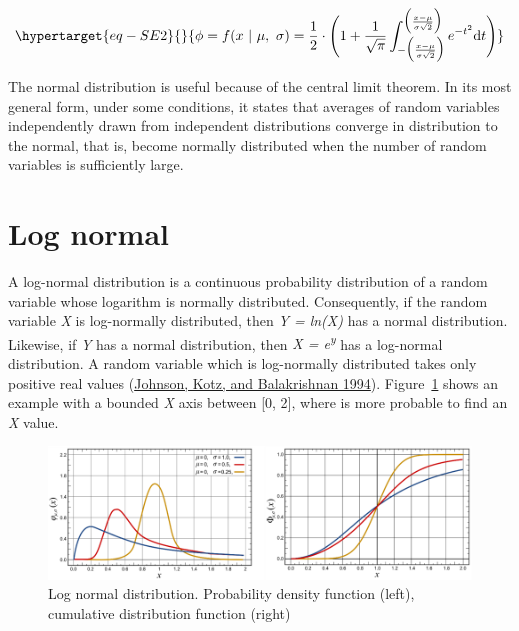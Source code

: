 \documentclass[
  letterpaper,
  DIV=11,
  numbers=noendperiod]{scrreprt}
\begin{document}
\begin{equation}\protect\hypertarget{eq-SE2}{}{
\phi = f(x\ |\ \mu,\ \sigma) = \frac{1}{2}\cdot \Bigg( 1 + \frac{1}{\sqrt{\pi}}\int_{- \Big( \frac{x - \mu}{\sigma\sqrt{2}} \Big)}^{\Big( \frac{x - \mu}{\sigma\sqrt{2}} \Big)}e^{{- t}^{2}} \mathrm{d}t \Bigg)
}\label{eq-SE2}\end{equation}

The normal distribution is useful because of the central limit theorem.
In its most general form, under some conditions, it states that averages
of random variables independently drawn from independent distributions
converge in distribution to the normal, that is, become normally
distributed when the number of random variables is sufficiently large.

\hypertarget{log-normal}{%
\section{Log normal}\label{log-normal}}

A log-normal distribution is a continuous probability distribution of a
random variable whose logarithm is normally distributed. Consequently,
if the random variable \emph{X} is log-normally distributed, then
\emph{Y = ln(X)} has a normal distribution. Likewise, if \emph{Y} has a
normal distribution, then \emph{X = e\textsuperscript{y}} has a
log-normal distribution. A random variable which is log-normally
distributed takes only positive real values
(\protect\hyperlink{ref-johnson_14_1994}{Johnson, Kotz, and Balakrishnan
1994}). Figure~\ref{fig-distribution_lognormal} shows an example with a
bounded \emph{X} axis between {[}0, 2{]}, where is more probable to find
an \emph{X} value.

\begin{figure}

{\centering \includegraphics{./figures/fig-distribution_lognormal.png}

}

\caption{\label{fig-distribution_lognormal}Log normal distribution.
Probability density function (left), cumulative distribution function
(right)}

\end{figure}
\end{document}
